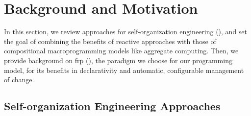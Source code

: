 \section{Background and Motivation}\label{acsos2023-frp:sec:background}


In this section,
 we review approaches for self-organization engineering (),
 and set the goal of combining the benefits of reactive approaches
with those of compositional macroprogramming models like aggregate computing.
%
Then, we provide background on \ac{frp} (),
 the paradigm we choose for our programming model,
 for its benefits in declarativity and
 automatic, configurable management of change.

\subsection{Self-organization Engineering Approaches}
\label{acsos2023-frp:sec:background:selforg}



